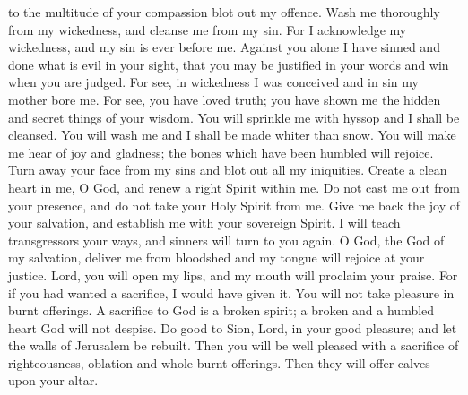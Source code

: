 \documentclass{article}
\begin{document}
\begin{multicols}{2}
{			to the multitude of your compassion blot out my offence. Wash me thoroughly
			from my wickedness, and cleanse me from my sin. For I acknowledge
			my wickedness, and my sin is ever before me. Against you alone I have
			sinned and done what is evil in your sight, that you may be justified in your
			words and win when you are judged. For see, in wickedness I was conceived
			and in sin my mother bore me. For see, you have loved truth; you have shown
			me the hidden and secret things of your wisdom. You will sprinkle me with
			hyssop and I shall be cleansed. You will wash me and I shall be made whiter
			than snow. You will make me hear of joy and gladness; the bones which have
			been humbled will rejoice. Turn away your face from my sins and blot out all
			my iniquities. Create a clean heart in me, O God, and renew a right Spirit
			within me. Do not cast me out from your presence, and do not take your Holy
			Spirit from me. Give me back the joy of your salvation, and establish me with
			your sovereign Spirit. I will teach transgressors your ways, and sinners will
			turn to you again. O God, the God of my salvation, deliver me from bloodshed
			and my tongue will rejoice at your justice. Lord, you will open my lips,
			and my mouth will proclaim your praise. For if you had wanted a sacrifice, I
			would have given it. You will not take pleasure in burnt offerings. A sacrifice
			to God is a broken spirit; a broken and a humbled heart God will not despise.
			Do good to Sion, Lord, in your good pleasure; and let the walls of Jerusalem
			be rebuilt. Then you will be well pleased with a sacrifice of righteousness,
			oblation and whole burnt offerings. Then they will offer calves upon your altar.
		}
	\end{multicols}
	\pagebreak
\end{document}
